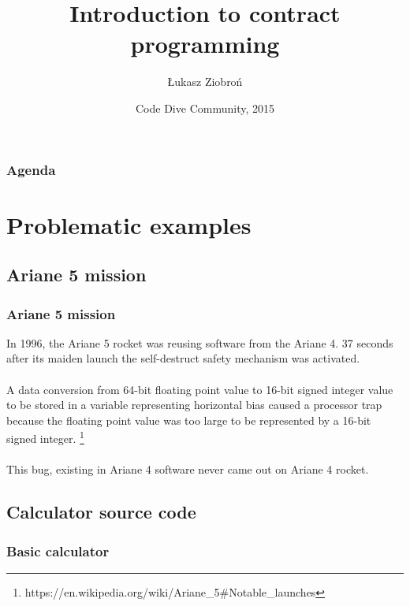 \documentclass{beamer}
\title[Crisis]{Introduction to contract programming}
\author{Łukasz Ziobroń}
\institute{Nokia}
\date{Code Dive Community, 2015}
\begin{document}
\begin{frame}
\titlepage
\end{frame}

\begin{frame}
\frametitle{Agenda}
\tableofcontents[hideallsubsections]
\end{frame}


\section{Problematic examples}
\subsection{Ariane 5 mission}
\begin{frame}
\frametitle{Ariane 5 mission}
{
  In 1996, the Ariane 5 rocket was reusing software from the Ariane 4. 37 seconds after its maiden launch the self-destruct safety mechanism was activated. \\~\\
  A data conversion from 64-bit floating point value to 16-bit signed integer value to be stored in a variable representing horizontal bias caused a processor trap because the floating point value was too large to be represented by a 16-bit signed integer. \footnote{https://en.wikipedia.org/wiki/Ariane\_5\#Notable\_launches} \\~\\
  This bug, existing in Ariane 4 software never came out on Ariane 4 rocket.
}
\end{frame}

\subsection{Calculator source code}
\begin{frame}[fragile]
\frametitle{Basic calculator}
\end{frame}
\end{document}
